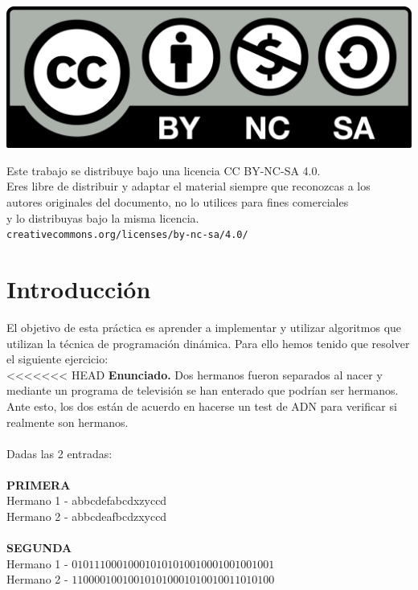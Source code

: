 \documentclass[10pt,a4paper]{article}
\begin{document}
\parbox[t]{\textwidth}{
  \includegraphics[scale=0.05]{by-nc-sa.png}\\[4pt]
  \raggedright %
  \sffamily\large
  {\Large Este trabajo se distribuye bajo una licencia CC BY-NC-SA 4.0.}\\[4pt]
  Eres libre de distribuir y adaptar el material siempre que reconozcas a los\\
  autores originales del documento, no lo utilices para fines comerciales\\
  y lo distribuyas bajo la misma licencia.\\[4pt]
  \texttt{creativecommons.org/licenses/by-nc-sa/4.0/}
}

\newpage

\tableofcontents

\newpage

\section{Introducción}

El objetivo de esta práctica es aprender a implementar y utilizar algoritmos que utilizan la técnica de programación dinámica. Para ello hemos tenido que resolver el siguiente ejercicio:\\

<<<<<<< HEAD
\textbf{Enunciado.} Dos hermanos fueron separados al nacer y mediante un programa de televisión se han enterado que podrían ser hermanos. Ante esto, los dos están de acuerdo en hacerse un test de ADN para verificar si realmente son hermanos.\\
\\
Dadas las 2 entradas:\\
\\
\textbf{PRIMERA} \\
Hermano 1 - abbcdefabcdxzyccd \\
Hermano 2 - abbcdeafbcdzxyccd \\
\\
\textbf{SEGUNDA}\\
Hermano 1 - $010111000100010101010010001001001001$\\
Hermano 2 - $110000100100101010001010010011010100$\\
\end{document}

